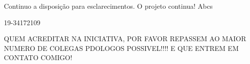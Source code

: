 Continuo a disposição para esclarecimentos.
O projeto continua!
Abcs


19-34172109
 
QUEM ACREDITAR NA INICIATIVA, POR FAVOR REPASSEM AO MAIOR NUMERO DE COLEGAS PDOLOGOS POSSIVEL!!!! E QUE ENTREM EM CONTATO COMIGO!

\address{Alexandre Demattê\\
  Departamento de Ciência do Solo, ESALQ/USP\\
  \url{http://www.solos.esalq.usp.br/docentes.htm}\\
  }

\address{Alessandro Samuel-Rosa\\
  ISRIC - World Soil Information\\
  \url{http://www.soil-scientist.net}\\
  }
